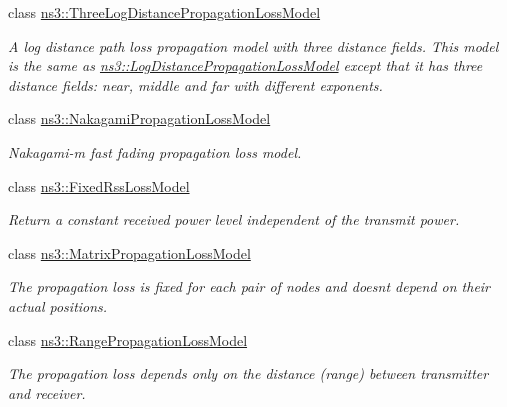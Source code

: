 \begin{DoxyCompactItemize}
class \hyperlink{classns3_1_1ThreeLogDistancePropagationLossModel}{ns3\+::\+Three\+Log\+Distance\+Propagation\+Loss\+Model}
\begin{DoxyCompactList}\small\item\em A log distance path loss propagation model with three distance fields. This model is the same as \hyperlink{classns3_1_1LogDistancePropagationLossModel}{ns3\+::\+Log\+Distance\+Propagation\+Loss\+Model} except that it has three distance fields\+: near, middle and far with different exponents. \end{DoxyCompactList}\item 
class \hyperlink{classns3_1_1NakagamiPropagationLossModel}{ns3\+::\+Nakagami\+Propagation\+Loss\+Model}
\begin{DoxyCompactList}\small\item\em Nakagami-\/m fast fading propagation loss model. \end{DoxyCompactList}\item 
class \hyperlink{classns3_1_1FixedRssLossModel}{ns3\+::\+Fixed\+Rss\+Loss\+Model}
\begin{DoxyCompactList}\small\item\em Return a constant received power level independent of the transmit power. \end{DoxyCompactList}\item 
class \hyperlink{classns3_1_1MatrixPropagationLossModel}{ns3\+::\+Matrix\+Propagation\+Loss\+Model}
\begin{DoxyCompactList}\small\item\em The propagation loss is fixed for each pair of nodes and doesn\textquotesingle{}t depend on their actual positions. \end{DoxyCompactList}\item 
class \hyperlink{classns3_1_1RangePropagationLossModel}{ns3\+::\+Range\+Propagation\+Loss\+Model}
\begin{DoxyCompactList}\small\item\em The propagation loss depends only on the distance (range) between transmitter and receiver. \end{DoxyCompactList}\end{DoxyCompactItemize}
